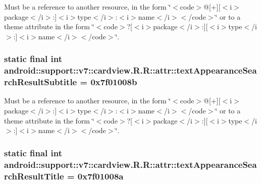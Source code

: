Must be a reference to another resource, in the form \char`\"{}$<$code$>$@\mbox{[}+\mbox{]}\mbox{[}$<$i$>$package$<$/i$>$:\mbox{]}$<$i$>$type$<$/i$>$:$<$i$>$name$<$/i$>$$<$/code$>$\char`\"{} or to a theme attribute in the form \char`\"{}$<$code$>$?\mbox{[}$<$i$>$package$<$/i$>$:\mbox{]}\mbox{[}$<$i$>$type$<$/i$>$:\mbox{]}$<$i$>$name$<$/i$>$$<$/code$>$\char`\"{}. \hypertarget{classandroid_1_1support_1_1v7_1_1cardview_1_1_r_1_1attr_42db1341678888a5546b31c22da35ec8}{
\subsubsection[{textAppearanceSearchResultSubtitle}]{\setlength{\rightskip}{0pt plus 5cm}static final int android::support::v7::cardview.R.R::attr::textAppearanceSearchResultSubtitle = 0x7f01008b}}
\label{classandroid_1_1support_1_1v7_1_1cardview_1_1_r_1_1attr_42db1341678888a5546b31c22da35ec8}


Must be a reference to another resource, in the form \char`\"{}$<$code$>$@\mbox{[}+\mbox{]}\mbox{[}$<$i$>$package$<$/i$>$:\mbox{]}$<$i$>$type$<$/i$>$:$<$i$>$name$<$/i$>$$<$/code$>$\char`\"{} or to a theme attribute in the form \char`\"{}$<$code$>$?\mbox{[}$<$i$>$package$<$/i$>$:\mbox{]}\mbox{[}$<$i$>$type$<$/i$>$:\mbox{]}$<$i$>$name$<$/i$>$$<$/code$>$\char`\"{}. \hypertarget{classandroid_1_1support_1_1v7_1_1cardview_1_1_r_1_1attr_8b62fa9c9c85c5401446dd020fcd1e97}{
\subsubsection[{textAppearanceSearchResultTitle}]{\setlength{\rightskip}{0pt plus 5cm}static final int android::support::v7::cardview.R.R::attr::textAppearanceSearchResultTitle = 0x7f01008a}}
\label{classandroid_1_1support_1_1v7_1_1cardview_1_1_r_1_1attr_8b62fa9c9c85c5401446dd020fcd1e97}


